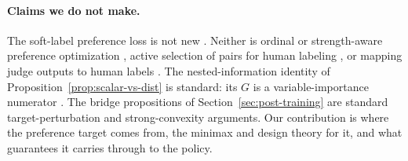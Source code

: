\paragraph{Claims we do not make.}
The soft-label preference loss is not new \citep{lee2024rlaif,furuta2024gapo}. Neither is ordinal or
strength-aware preference optimization \citep{imai2026mixdpo}, active selection of pairs for human
labeling \citep{shen2025active,xu2025rlthf}, or mapping judge outputs to human labels
\citep{vandenburg2025aligning}. The nested-information identity of
Proposition~\ref{prop:scalar-vs-dist} is standard: its $G$ is a variable-importance numerator
\citep{williamson2021nonparametric,williamson2023general}. The bridge propositions of Section~\ref{sec:post-training} are standard
target-perturbation and strong-convexity arguments. Our contribution is where the preference target
comes from, the minimax and design theory for it, and what guarantees it carries through to the
policy.
